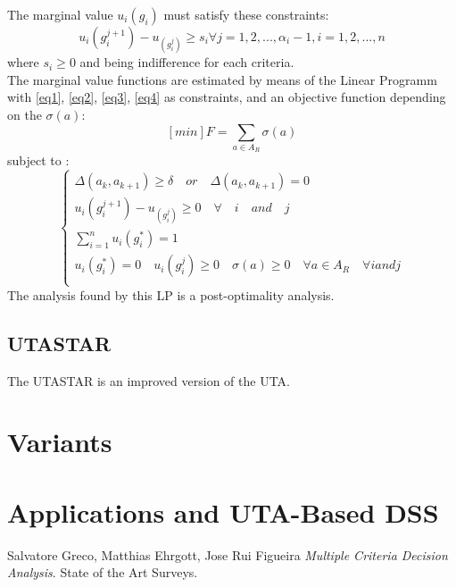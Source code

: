 \documentclass{report}
\begin{document}
The marginal value $u_i (g_i)$ must satisfy these constraints: 
\begin{equation}\label{eq4}
u_i (g_i^{j+1}) - u_(g_i^{j}) \geq s_i \forall j = 1,2, ..., \alpha _i  - 1, i = 1,2, ..., n 
\end{equation}
where $s_i \geq 0$ and being indifference for each criteria.  \\

The marginal value functions are estimated by means of the Linear Programm with \eqref{eq1}, \eqref{eq2}, \eqref{eq3}, \eqref{eq4} as constraints, and an objective function depending on the $\sigma(a)$: 
$$ [min]F = \sum_{a \in A_R} \sigma(a)  $$
subject to : \\
\begin{equation}
  \left\{
      \begin{aligned}
      \Delta (a_k, a_{k+1} ) \geq \delta \quad or \quad \Delta (a_k, a_{k+1} ) = 0 \\
       u_i (g_i^{j+1}) - u_(g_i^{j}) \geq 0 \quad \forall \quad i \quad and \quad j\\
       \sum_{i=1}^{n} u_i(g_{i}^{*}) = 1\\
u_i (g_i^{*}) = 0 \quad  u_i(g_i^{j}) \geq 0 \quad  \sigma(a) \geq 0 \quad  \forall a \in A_R\quad  \forall i and j\\
      \end{aligned}
    \right.
\end{equation}
The analysis found by this LP is a post-optimality analysis. 

\section{UTASTAR}
The UTASTAR is an improved version of the UTA.

\chapter{Variants}

\chapter{Applications and UTA-Based DSS}

\begin{thebibliography}{9}
Salvatore Greco, Matthias Ehrgott, Jose Rui Figueira \textit{Multiple Criteria Decision Analysis}. 
State of the Art Surveys.
\end{thebibliography}
\end{document}
